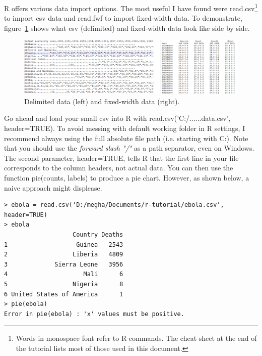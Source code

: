 \documentclass{report}
\newcommand{\code}[1]{\textsf{\ttfamily #1}}
\begin{document}
		R offers various data import options. The most useful I have found were \code{read.csv}\footnote{Words in monospace font refer to R commands. The cheat sheet at the end of the tutorial lists most of those used in this document.} to import csv data and \code{read.fwf} to import fixed-width data. To demonstrate, figure~\ref{fig:data} shows what csv (delimited) and fixed-width data look like side by side.
		\begin{figure}[h]
			\centering
			\includegraphics[width=1.0\textwidth]{data.png}
			\caption{Delimited data (left) and fixed-width data (right).}
			\label{fig:data}
		\end{figure}

		Go ahead and load your small csv into R with \code{read.csv('C:/......data.csv', header=TRUE)}. To avoid messing with default working folder in R settings, I recommend always using the full absolute file path (i.e. starting with C:). Note that you should use the \emph{forward slash "/"} as a path separator, even on Windows. The second parameter, \code{header=TRUE}, tells R that the first line in your file corresponds to the column headers, not actual data. You can then use the function \code{pie(counts, labels)} to produce a pie chart. However, as shown below, a naive approach might displease.
		\begin{verbatim}
> ebola = read.csv('D:/megha/Documents/r-tutorial/ebola.csv', header=TRUE)
> ebola
                   Country Deaths
1                   Guinea   2543
2                  Liberia   4809
3             Sierra Leone   3956
4                     Mali      6
5                  Nigeria      8
6 United States of America      1
> pie(ebola)
Error in pie(ebola) : 'x' values must be positive.
		\end{verbatim}
\end{document}
